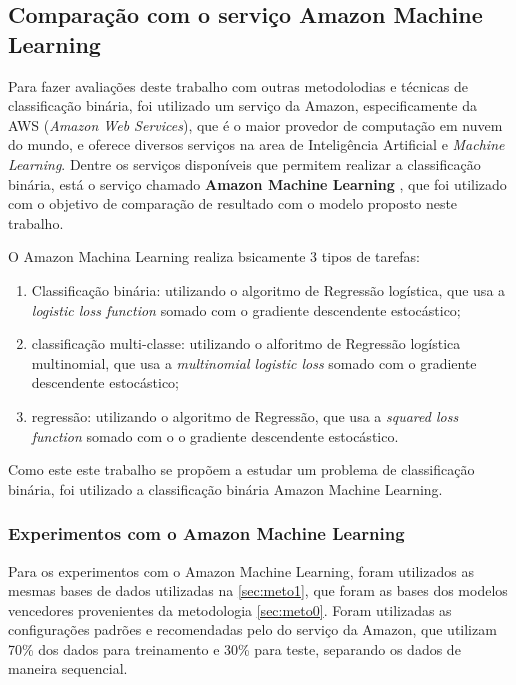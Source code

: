 \subsection{Comparação com o serviço Amazon Machine Learning}

Para fazer avaliações deste trabalho com outras metodolodias e técnicas de classificação binária, foi utilizado um serviço da Amazon, especificamente da AWS (\textit{Amazon Web Services}), que é o maior provedor de computação em nuvem do mundo, e oferece diversos serviços na area de Inteligência Artificial e \textit{Machine Learning}. Dentre os serviços disponíveis que permitem realizar a classificação binária, está o serviço chamado \textbf{Amazon Machine Learning}  \cite{amazonmachinelearning}, que foi utilizado com o objetivo de comparação de resultado com o modelo proposto neste trabalho.

O Amazon Machina Learning realiza bsicamente 3 tipos de tarefas:

\begin{enumerate}
    \item Classificação binária: utilizando o algoritmo de Regressão logística, que usa a \textit{logistic loss function} somado com o gradiente descendente estocástico;
    \item classificação multi-classe: utilizando o alforitmo de Regressão logística multinomial, que usa a \textit{multinomial logistic loss} somado com o gradiente descendente estocástico;
    \item regressão: utilizando o algoritmo de Regressão, que usa a \textit{squared loss function} somado com o o gradiente descendente estocástico.
\end{enumerate}

Como este este trabalho se propõem a estudar um problema de classificação binária, foi utilizado a classificação binária Amazon Machine Learning. 

\subsubsection{Experimentos com o Amazon Machine Learning}

Para os experimentos com o Amazon Machine Learning, foram utilizados as mesmas bases de dados utilizadas na \ref{sec:meto1}, que foram as bases dos modelos vencedores provenientes da metodologia \ref{sec:meto0}. Foram utilizadas as configurações padrões e recomendadas pelo do serviço da Amazon, que utilizam 70\% dos dados para treinamento e 30\% para teste, separando os dados de maneira sequencial.

